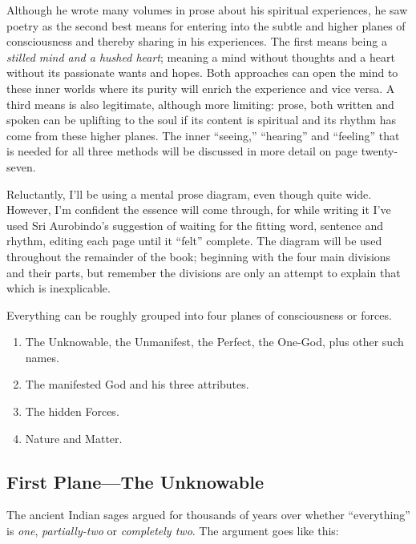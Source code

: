 \documentclass[12pt,a4paper]{book}
\begin{document}
Although he wrote many volumes in prose about his spiritual
experiences, he saw poetry as the second best means for entering into
the subtle and higher planes of consciousness and thereby sharing in
his experiences. The first means being a \emph{stilled mind and a
  hushed heart}; meaning a mind without thoughts and a heart without
its passionate wants and hopes. Both approaches can open the mind to
these inner worlds where its purity will enrich the experience and
vice versa. A third means is also legitimate, although more limiting:
prose, both written and spoken can be uplifting to the soul if its
content is spiritual and its rhythm has come from these higher planes.
The inner ``seeing,'' ``hearing'' and ``feeling'' that is needed for
all three methods will be discussed in more detail on page
twenty-seven.

Reluctantly, I'll be using a mental prose diagram, even though quite
wide. However, I'm confident the essence will come through, for while
writing it I've used Sri Aurobindo's suggestion of waiting for the
fitting word, sentence and rhythm, editing each page until it ``felt''
complete.  The diagram will be used throughout the remainder of the
book; beginning with the four main divisions and their parts, but
remember the divisions are only an attempt to explain that which is
inexplicable.

Everything can be roughly grouped into four planes of consciousness or forces.


\begin{enumerate}
\item The Unknowable, the Unmanifest, the Perfect, the One-God, plus other such names.

\item The manifested God and his three attributes.

\item The hidden Forces.

\item Nature and Matter.
\end{enumerate}


\newpage
\begin{center}\section*{First Plane---The Unknowable}\end{center}

The ancient Indian sages argued for thousands of years over whether
``everything'' is \emph{one}, \emph{partially-two} or \emph{completely
  two}. The argument goes like this:
\end{document}
